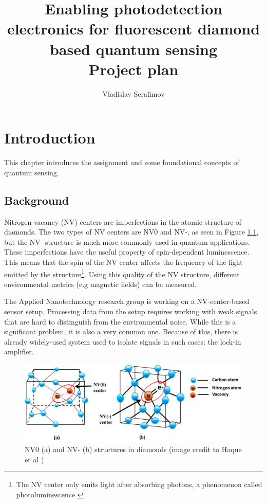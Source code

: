 \documentclass{report}
\title{Enabling photodetection electronics for 
	fluorescent diamond based quantum sensing \\Project plan}
\author{Vladislav Serafimov}
\begin{document}
	\maketitle
	
	\tableofcontents
	
	\chapter{Introduction}
	This chapter introduces the assignment and some foundational concepts of quantum sensing.
	
	\section{Background}
	Nitrogen-vacancy (NV) centers \cite{enwiki:1301369588} are imperfections in the atomic structure of diamonds. The two types of NV centers are NV0 and NV-, as seen in Figure \ref{fig:nvcenter}, but the NV- structure is much more commonly used in quantum applications. These imperfections have the useful property of spin-dependent luminescence. This means that the spin of the NV center affects the frequency of the light emitted by the structure\footnote{The NV center only emits light after absorbing photons, a phenomenon called photoluminescence \cite{enwiki:1309081879}}. Using this quality of the NV structure, different environmental metrics (e.g magnetic fields) can be measured. 
	
	The Applied Nanotechnology research group is working on a NV-center-based sensor setup. Processing data from the setup requires working with weak signals that are hard to distinguish from the environmental noise. While this is a significant problem, it is also a very common one. Because of this, there is already widely-used system used to isolate signals in such cases: the lock-in amplifier.
	
	\begin{figure}[ht]
		\centering
		\includegraphics[width=0.7\linewidth]{img/nv_center}
		\caption{NV0 (a) and NV- (b) structures in diamonds (image credit to Haque et al \cite{haque2017overview})}
		\label{fig:nvcenter}
	\end{figure}
	
\end{document}
